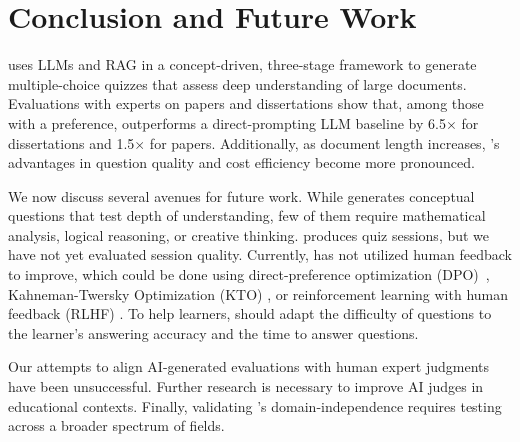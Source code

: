 \section{Conclusion and Future Work}
\label{sec:concl}

\name uses LLMs and RAG in a concept-driven, three-stage framework to generate multiple-choice quizzes that assess deep understanding of large documents. Evaluations with \totalevaluators experts on \totaldocuments papers and dissertations show that, among those with a preference, \name outperforms a direct-prompting LLM baseline by 6.5$\times$ for dissertations and 1.5$\times$ for papers. Additionally, as document length increases, \name's advantages in question quality and cost efficiency become more pronounced.


We now discuss several avenues for future work.
While \name generates conceptual questions that test depth of understanding, few of them require mathematical analysis, logical reasoning, or creative thinking. \name produces quiz sessions, but we have not yet evaluated session quality. Currently, \name has not utilized human feedback to improve, which could be done using direct-preference optimization (DPO)~\cite{dpo}, Kahneman-Twersky Optimization (KTO) \cite{kto}, or reinforcement learning with human feedback (RLHF) \cite{rlhf}. To help learners, \name should adapt the difficulty of questions to the learner's answering accuracy and the time to answer questions. 


Our attempts to align AI-generated evaluations with human expert judgments have been unsuccessful. Further research is necessary to improve AI judges in educational contexts.
Finally, validating \name's domain-independence requires testing across a broader spectrum of fields. 